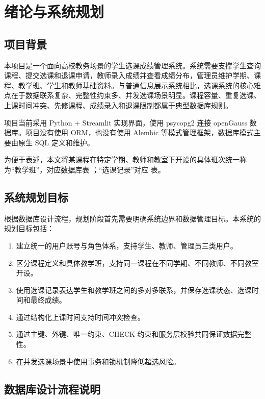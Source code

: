 \chapter{绪论与系统规划}

\section{项目背景}

本项目是一个面向高校教务场景的学生选课成绩管理系统。系统需要支撑学生查询课程、提交选课和退课申请，教师录入成绩并查看成绩分布，管理员维护学期、课程、教学班、学生和教师基础资料。与普通信息展示系统相比，选课系统的核心难点在于数据联系复杂、完整性约束多、并发选课场景明显。课程容量、重复选课、上课时间冲突、先修课程、成绩录入和退课限制都属于典型数据库规则。

项目当前采用 Python + Streamlit 实现界面，使用 psycopg2 连接 openGauss 数据库。项目没有使用 ORM，也没有使用 Alembic 等模式管理框架，数据库模式主要由原生 SQL 定义和维护。

为便于表述，本文将某课程在特定学期、教师和教室下开设的具体班次统一称为“教学班”，对应数据库表 ；“选课记录”对应  表。

\section{系统规划目标}

根据数据库设计流程，规划阶段首先需要明确系统边界和数据管理目标。本系统的规划目标包括：

\begin{enumerate}
  \item 建立统一的用户账号与角色体系，支持学生、教师、管理员三类用户。
  \item 区分课程定义和具体教学班，支持同一课程在不同学期、不同教师、不同教室开设。
  \item 使用选课记录表达学生和教学班之间的多对多联系，并保存选课状态、选课时间和最终成绩。
  \item 通过结构化上课时间支持时间冲突检查。
  \item 通过主键、外键、唯一约束、CHECK 约束和服务层校验共同保证数据完整性。
  \item 在并发选课场景中使用事务和锁机制降低超选风险。
\end{enumerate}

\section{数据库设计流程说明}

